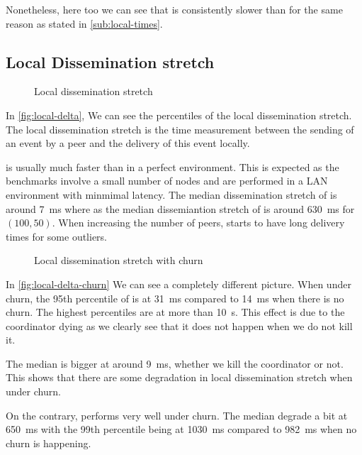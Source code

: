 Nonetheless, here too we can see that \epto is consistently slower than \jgroups for the same reason as stated in \autoref{sub:local-times}.
\subsection{Local Dissemination stretch}
\begin{figure*}[hpt]
	\centering
	
	\vspace{-2mm} 
	\caption{Local dissemination stretch}
	\vspace{-2mm}
	\label{fig:local-delta}  
\end{figure*}
In \autoref{fig:local-delta}, We can see the percentiles of the local dissemination stretch. The local dissemination stretch is the time measurement between the sending of an event by a peer and the delivery of this event locally.

\jgroups is usually much faster than \epto in a perfect environment. This is expected as the benchmarks involve a small number of nodes and are performed in a LAN environment with minmimal latency. The median dissemination stretch of \jgroups is around \SI{7}{\milli\second} where as the median dissemiantion stretch of \epto is around \SI{630}{\milli\second} for $(100,50)$. When increasing the number of peers, \jgroups starts to have long delivery times for some outliers.

\begin{figure}[hpt]
	\centering
	
	\vspace{-2mm} 
	\caption{Local dissemination stretch with churn}
	\vspace{-2mm}
	\label{fig:local-delta-churn}   
\end{figure}
In \autoref{fig:local-delta-churn} We can see a completely different picture. When under churn, the 95th percentile of \jgroups is at \SI{31}{\milli\second} compared to \SI{14}{\milli\second} when there is no churn. The highest percentiles are at more than \SI{10}{\second}. This effect is due to the coordinator dying as we clearly see that it does not happen when we do not kill it.

The median is bigger at around \SI{9}{\milli\second}, whether we kill the coordinator or not. This shows that there are some degradation in \jgroups local dissemination stretch when under churn.

On the contrary, \epto performs very well under churn. The median degrade a bit at \SI{650}{\milli\second} with the 99th percentile being at \SI{1030}{\milli\second} compared to \SI{982}{\milli\second} when no churn is happening.
